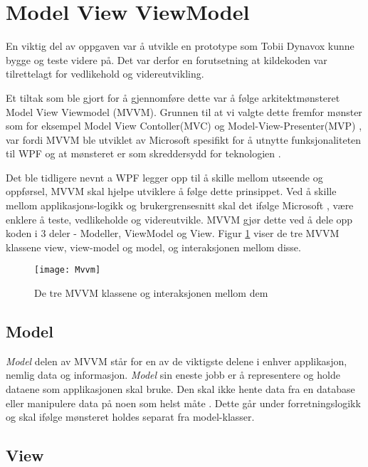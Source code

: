  
\section{Model View ViewModel} 

En viktig del av oppgaven var å utvikle en prototype som Tobii Dynavox kunne bygge og teste videre på. Det var derfor en forutsetning at kildekoden var tilrettelagt for vedlikehold og videreutvikling. 

Et tiltak som ble gjort for å gjennomføre dette var å følge arkitektmønsteret Model View Viewmodel (MVVM). Grunnen til at vi valgte dette fremfor mønster som for eksempel Model View Contoller(MVC) \cite{MVCa2:online} og Model-View-Presenter(MVP) \cite{TheM4:online}, var fordi MVVM ble utviklet av Microsoft spesifikt for å utnytte funksjonaliteten til WPF og at mønsteret er som skreddersydd for teknologien \cite{THEM6:online}. 

Det ble tidligere nevnt a WPF legger opp til å skille mellom utseende og oppførsel, MVVM skal hjelpe utviklere å følge dette prinsippet. Ved å skille mellom applikasjons-logikk og brukergrensesnitt skal det ifølge Microsoft \cite{Im1online}, være enklere å teste, vedlikeholde og videreutvikle. MVVM gjør dette ved å dele opp koden i 3 deler - Modeller, ViewModel og View. Figur \ref{fig:mvvm} viser de tre MVVM klassene view, view-model og model, og interaksjonen mellom disse.
 
\begin{figure}[ht!] 
\centering 
\texttt{[image: Mvvm]} 
\caption{De tre MVVM klassene og  interaksjonen mellom dem \cite{Im1online}} 
\label{fig:mvvm} 
\end{figure}


\subsection{Model}

\textit{Model} delen av MVVM står for en av de viktigste delene i enhver applikasjon, nemlig data og informasjon. \textit{Model} sin eneste jobb er å representere og holde dataene som applikasjonen skal bruke. Den skal ikke hente data fra en database eller manipulere data på noen som helst måte \cite{Model7:online}. Dette går under forretningslogikk og skal ifølge mønsteret holdes separat fra model-klasser. 


\subsection{View}
 
